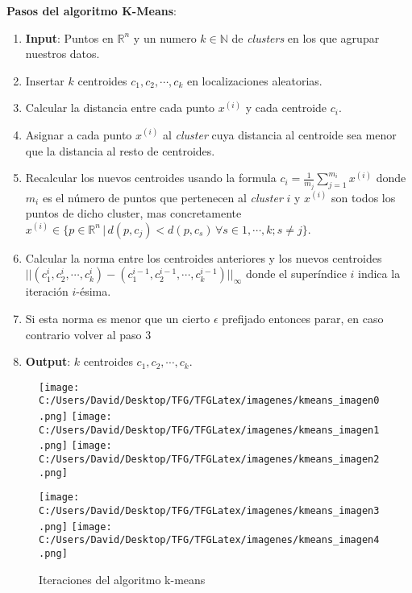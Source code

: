 \noindent \textbf{Pasos del algoritmo K-Means}:
\begin{enumerate}
  \item \textbf{Input}: Puntos en $\mathds{R}^n$ y un numero $k \in \mathds{N}$ de \textit{clusters}
  en los que agrupar nuestros datos.
  \item Insertar $k$ centroides $c_1, c_2, \cdots, c_k$ en localizaciones aleatorias.
  \item Calcular la distancia entre cada punto $x^{(i)}$ y cada centroide $c_i$.
  \item Asignar a cada punto $x^{(i)}$ al \textit{cluster} cuya distancia al centroide sea menor 
        que la distancia al resto de centroides.
  \item Recalcular los nuevos centroides usando la formula $c_i = \frac{1}{m_j} \sum_{j=1}^{m_i}x^{(i)}$ 
        donde $m_i$ es el número de puntos que pertenecen al \textit{cluster} $i$ y $x^{(i)}$ son 
        todos los puntos de dicho cluster, mas concretamente \\
        $x^{(i)} \in \{ p \in \mathds{R}^n \, | \, d(p, c_j) < d(p, c_s) \, \forall s \in 1, \cdots, k; s \neq j \}$.
  \item Calcular la norma entre los centroides anteriores y los nuevos centroides \\
        $ ||(c_1^i, c_2^i, \cdots, c_k^i) - (c_1^{i-1}, c_2^{i-1}, \cdots, c_k^{i-1})||_{\infty} $ 
        donde el superíndice $i$ indica la iteración $i$-ésima.
  \item Si esta norma es menor que un cierto $\epsilon$ prefijado entonces parar, en caso contrario 
        volver al paso $3$        
  \item \textbf{Output}: $k$ centroides $c_1, c_2, \cdots, c_k$.
\end{enumerate}


\begin{figure}[htp]
  \centering
  \texttt{[image: C:/Users/David/Desktop/TFG/TFGLatex/imagenes/kmeans\_imagen0.png]}\quad
  \texttt{[image: C:/Users/David/Desktop/TFG/TFGLatex/imagenes/kmeans\_imagen1.png]}\quad
  \texttt{[image: C:/Users/David/Desktop/TFG/TFGLatex/imagenes/kmeans\_imagen2.png]}

  \medskip

  \texttt{[image: C:/Users/David/Desktop/TFG/TFGLatex/imagenes/kmeans\_imagen3.png]}\quad
  \texttt{[image: C:/Users/David/Desktop/TFG/TFGLatex/imagenes/kmeans\_imagen4.png]}

  \caption{Iteraciones del algoritmo k-means}
  \label{kmeans_iteraciones} %
\end{figure}

